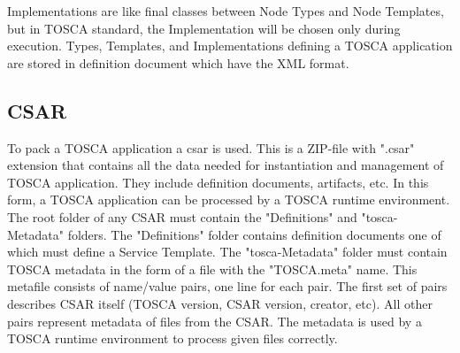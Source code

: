 Implementations are like final classes between Node Types and Node Templates, but in TOSCA standard, the Implementation will be chosen only during execution.
Types, Templates, and Implementations defining a TOSCA application are stored in definition document which have the XML format. %

%
\subsection*{CSAR} 
%
To pack a TOSCA application a \gls{csar}\label{sec:csar} is used.
This is a ZIP-file with ".csar" extension that contains all the data needed for instantiation and management of TOSCA application.
They include definition documents, artifacts, etc.
In this form, a TOSCA application can be processed by a TOSCA runtime environment.\\
The root folder of any CSAR must contain the "Definitions" and "\gls{tosca}-Metadata" folders.
The "Definitions" folder contains definition documents one of which must define a Service Template.
The "\gls{tosca}-Metadata" folder must contain TOSCA metadata in the form of a file with the "TOSCA.meta" name.
This metafile consists of name/value pairs, one line for each pair. 
The first set of pairs describes CSAR itself (TOSCA version, CSAR version, creator, etc). 
All other pairs represent metadata of files from the CSAR. 
The metadata is used by a TOSCA runtime environment to process given files correctly.\\
%

